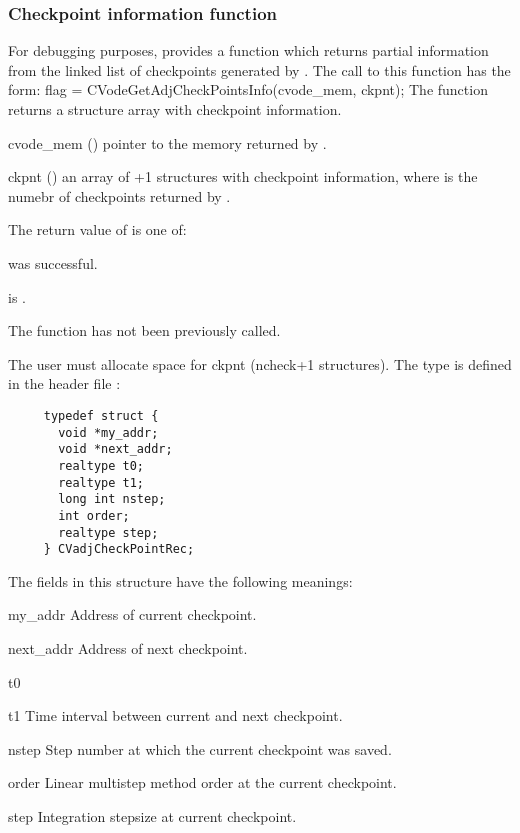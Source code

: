 \subsubsection{Checkpoint information function}
For debugging purposes, {\cvodes} provides a function  which
returns partial information from the linked list of checkpoints generated by
. The call to this function has the form:
{
  flag = CVodeGetAdjCheckPointsInfo(cvode\_mem, ckpnt);
}
{
  The function  returns a structure array
  with checkpoint information.
}
{  
  \begin{args}
  \item[cvode\_mem] ()
    pointer to the {\cvodes} memory returned by .
  \item[ckpnt] ()
    an array of +1 structures with checkpoint information, where
     is the numebr of checkpoints returned by .
  \end{args}
}
{
  The return value  of  is one of:
  \begin{args}
  \item[\Id{CV\_SUCCESS}] 
     was successful.
  \item[\Id{CV\_MEM\_NULL}] 
     is .
  \item[\Id{CV\_NO\_ADJ}]
    The function  has not been previously called.
  \end{args}
}
{
  {\warn}The user must allocate space for ckpnt (ncheck+1 structures).
}
The type  is defined in the header file :
\begin{verbatim}
     typedef struct {
       void *my_addr;
       void *next_addr;
       realtype t0;
       realtype t1;
       long int nstep;
       int order;
       realtype step;
     } CVadjCheckPointRec;
\end{verbatim}
The fields in this structure have the following meanings:
\begin{args}
\item[my\_addr]
  Address of current checkpoint.
\item[next\_addr]
  Address of next checkpoint.
\item[t0]
\item[t1]
  Time interval between current and next checkpoint.
\item[nstep]
  Step number at which the current checkpoint was saved.
\item[order]
  Linear multistep method order at the current checkpoint.
\item[step]
  Integration stepsize at current checkpoint.
\end{args}

